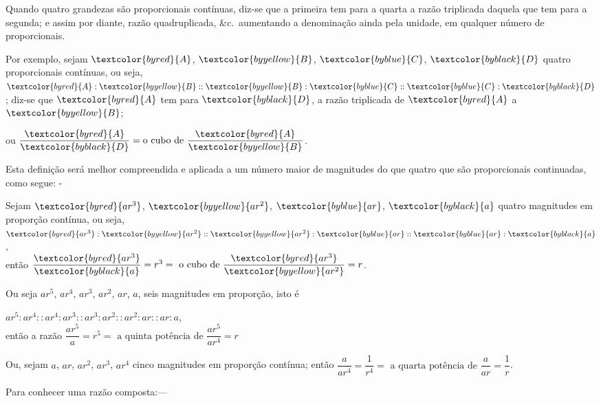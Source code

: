 \documentclass[booklanguage=brazilian]{byrnebook}
\begin{document}
\vfill\pagebreak

\label{def:V.XI}
\def\varA{\textcolor{byred}{A}}
\def\varB{\textcolor{byyellow}{B}}
\def\varC{\textcolor{byblue}{C}}
\def\varD{\textcolor{byblack}{D}}
\def\vararQ{\textcolor{byred}{ar^3}}
\def\vararS{\textcolor{byyellow}{ar^2}}
\def\varar{\textcolor{byblue}{ar}}
\def\vara{\textcolor{byblack}{a}}
Quando quatro grandezas são proporcionais contínuas, diz-se que a primeira tem para a quarta a razão triplicada daquela que tem para a segunda; e assim por diante, razão quadruplicada, \&c.\ aumentando a denominação ainda pela unidade, em qualquer número de proporcionais.

Por exemplo, sejam $\varA$, $\varB$, $\varC$, $\varD$ quatro proporcionais contínuas, ou seja, $\varA : \varB :: \varB : \varC :: \varC : \varD$; diz-se que $\varA$ tem para $\varD$, a razão triplicada de $\varA$ a $\varB$;

\begin{center}
ou $\dfrac{\varA}{\varD} = \mbox{o cubo de } \dfrac{\varA}{\varB}$.
\end{center}

Esta definição será melhor compreendida e aplicada a um número maior de magnitudes do que quatro que são proporcionais continuadas, como segue: -

\begin{center}
Sejam $\vararQ$, $\vararS$, $\varar$, $\vara$ quatro magnitudes em proporção contínua, ou seja, $\vararQ : \vararS :: \vararS : \varar :: \varar : \vara$,\\
então $\dfrac{\vararQ}{\vara} = r^3 = \mbox{ o cubo de } \dfrac{\vararQ}{\vararS} = r$.
\end{center}

Ou seja $ar^5$, $ar^4$, $ar^3$, $ar^2$, $ar$, $a$, seis magnitudes em proporção, isto é

\begin{center}
$ar^5 : ar^4 :: ar^4 : ar^3 :: ar^3 : ar^2 :: ar^2 : ar :: ar : a$,\\
então a razão $\dfrac{ar^5}{a} = r^5 = \mbox{ a quinta potência de } \dfrac{ar^5}{ar^4} = r$
\end{center}

Ou, sejam $a$, $ar$, $ar^2$, $ar^3$, $ar^4$ cinco magnitudes em proporção contínua; então $\dfrac{a}{ar^4} = \dfrac{1}{r^4} = \mbox{ a quarta potência de } \dfrac{a}{ar} = \dfrac{1}{r}$.

\vfill\pagebreak

\label{def:V.A}
\def\varA{\textcolor{byred}{A}}
\def\varB{\textcolor{byred}{B}}
\def\varC{\textcolor{byred}{C}}
\def\varD{\textcolor{byred}{D}}
\def\varE{\textcolor{byblue}{E}}
\def\varF{\textcolor{byblue}{F}}
\def\varG{\textcolor{byblue}{G}}
\def\varH{\textcolor{byblue}{H}}
\def\varK{\textcolor{byblue}{K}}
\def\varL{\textcolor{byblue}{L}}
\def\varM{\textcolor{byyellow}{M}}
\def\varN{\textcolor{byyellow}{N}}
Para conhecer uma razão composta:—
\end{document}
